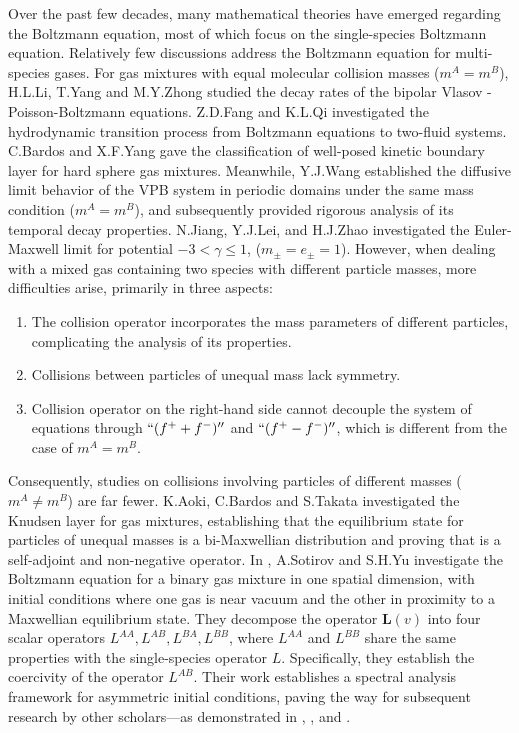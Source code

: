 \documentclass[reqno]{amsart}
\numberwithin{equation}{section}
\numberwithin{equation}{section}
\begin{document}
Over the past few decades, many mathematical theories have emerged regarding the Boltzmann equation, most of which focus on the single-species Boltzmann equation. Relatively few discussions address the Boltzmann equation for multi-species gases. For gas mixtures with equal molecular collision masses ($m^A = m^B$), H.L.Li, T.Yang and M.Y.Zhong \cite{[meq]LYZ} studied the decay rates of the bipolar Vlasov -Poisson-Boltzmann equations. Z.D.Fang and K.L.Qi \cite{[FQ]ARC} investigated the hydrodynamic transition process from Boltzmann equations to two-fluid systems. C.Bardos and X.F.Yang \cite{[7]Bardos2012CPDE} gave the classification of well-posed kinetic boundary
layer for hard sphere gas mixtures. Meanwhile, Y.J.Wang \cite{YJWangSIMA} established the diffusive limit behavior of the VPB system in periodic domains under the same mass condition ($m^A = m^B$), and subsequently \cite{[49]WangJDE2013} provided rigorous analysis of its temporal decay properties. N.Jiang, Y.J.Lei, and H.J.Zhao \cite{[2025X]Jiang} investigated the Euler-Maxwell limit for potential  $-3<\gamma\leq1$, ($m_{\pm}=e_{\pm}=1$).
However, when dealing with a mixed gas containing two species with different particle masses, more difficulties arise, primarily in three aspects:
\begin{enumerate}
	\item The collision operator incorporates the mass parameters of different particles, complicating the analysis of its properties.
	\item Collisions between particles of unequal mass lack symmetry.
	\item Collision operator on the right-hand side cannot decouple the system of equations through $``(f^{+}+f^{-})''$ and $``(f^{+}-f^{-})''$, which is different from the case of $m^A=m^B$.
\end{enumerate}

Consequently, studies on collisions involving particles of different masses ($m^A \neq m^B$) are far fewer. K.Aoki, C.Bardos and S.Takata \cite{[1]Aoki2003JSP} investigated the Knudsen layer for gas mixtures, establishing that the equilibrium state for particles of unequal masses is a bi-Maxwellian distribution and proving that is a self-adjoint and non-negative operator.  
In \cite{[YU2010]}, A.Sotirov and S.H.Yu investigate the Boltzmann equation for a binary gas mixture in one spatial dimension, with initial conditions where one gas is near vacuum and the other in proximity to a Maxwellian equilibrium state. They decompose the operator 
$\bm{L}(v)$ into four scalar operators $L^{AA}, L^{AB}, L^{BA}, L^{BB}$, where $L^{AA}$ and $L^{BB}$ share the same properties with the single-species operator $L$. Specifically, they establish the coercivity of the operator $L^{AB}$. Their work establishes a spectral analysis framework for asymmetric initial conditions, paving the way for subsequent research by other scholars—as demonstrated in \cite{[2014]LSQ}, \cite{you3F}, \cite{you4F} and \cite{[51]Wu2024AA}.
\end{document}
